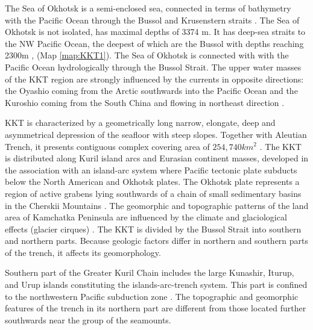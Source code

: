\documentclass[11pt,a4paper]{report}
\begin{document}
The Sea of Okhotsk is a semi-enclosed sea, connected in terms of bathymetry with the Pacific Ocean through the Bussol and Krusenstern straits \cite{MaiorovaAdrianov2018b}. The Sea of Okhotsk is not isolated, has maximal depths of 3374 m. It has deep-sea straits to the NW Pacific Ocean, the deepest of which are the Bussol with depths reaching 2300m \cite{Brandtetal2018}, (Map \ref{map:KKT1}). The Sea of Okhotsk is connected with with the Pacific Ocean hydrologically through the Bussol Strait. The upper water masses of the \ac{KKT} region are strongly influenced by the currents in opposite directions: the Oyashio coming from the Arctic southwards into the Pacific Ocean and the Kuroshio coming from the South China and flowing in northeast direction \cite{Belkinetal2009}.

\ac{KKT} is characterized by a geometrically long narrow, elongate, deep and asymmetrical depression of the seafloor with steep slopes. Together with Aleutian Trench, it presents contiguous complex covering area of $254,740 km^{2}$ \cite{Harrisetal2014}. The \ac{KKT} is distributed along Kuril island arcs and Eurasian continent masses, developed in the association with an island-arc system where Pacific tectonic plate subducts below the North American and Okhotsk plates. The Okhotsk plate represents a region of active grabens lying southwards of a chain of small sedimentary basins in the Cherskii Mountains \cite{Savostinetal1983}. The geomorphic and topographic patterns of the land area of Kamchatka Peninsula are influenced by the climate and glaciological effects (glacier cirques) \cite{BarrSpagnolo2015}. The \ac{KKT} is divided by the Bussol Strait into southern and northern parts. Because geologic factors differ in northern and southern parts of the trench, it affects its geomorphology. 

Southern part of the Greater Kuril Chain includes the large Kunashir, Iturup, and Urup islands constituting the islands-arc-trench system. This part is confined to the northwestern Pacific subduction zone \cite{Khomich}. The topographic and geomorphic features of the trench in its northern part are different from those located further southwards near the group of the seamounts.
\end{document}
